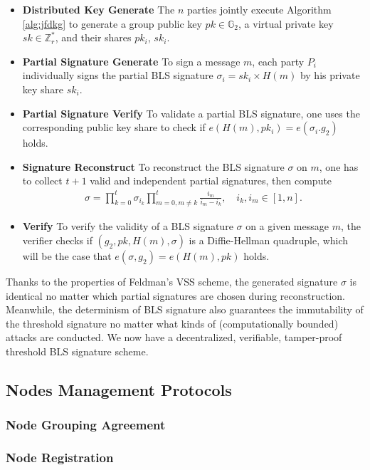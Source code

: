 \documentclass[11pt]{article}
\begin{document}
\begin{itemize}
    \item[] \textbf{Distributed Key Generate} The $n$ parties jointly execute Algorithm \ref{alg:jfdkg} to generate a group public key $pk \in \mathbb{G}_2$, a virtual private key $sk \in \mathbb{Z}_r^*$, and their shares $pk_i$, $sk_i$.
    \item[] \textbf{Partial Signature Generate} To sign a message $m$, each party $P_i$ individually signs the partial BLS signature $\sigma_i=sk_i \times H(m)$ by his private key share $sk_i$.
    \item[] \textbf{Partial Signature Verify} To validate a partial BLS signature, one uses the corresponding public key share to check if $e(H(m),pk_i)=e(\sigma_i.g_2)$ holds.
    \item[] \textbf{Signature Reconstruct} To reconstruct the BLS signature $\sigma$ on $m$, one has to collect $t+1$ valid and independent partial signatures, then compute
    \begin{align*}
        \sigma = \prod_{k=0}^t \sigma_{i_k} \prod_{m=0, m\neq k}^t \frac{i_m}{i_m-i_k},\quad i_k, i_m \in [1,n].
    \end{align*}
    \item[] \textbf{Verify} To verify the validity of a BLS signature $\sigma$ on a given message $m$, the verifier checks if $(g_2,pk,H(m),\sigma)$ is a Diffie-Hellman quadruple, which will be the case that $e(\sigma,g_2)=e(H(m),pk)$ holds.
\end{itemize}

Thanks to the properties of Feldman's VSS scheme, the generated signature $\sigma$ is identical no matter which partial signatures are chosen during reconstruction. Meanwhile, the determinism of BLS signature also guarantees the immutability of the threshold signature no matter what kinds of (computationally bounded) attacks are conducted. We now have a decentralized, verifiable, tamper-proof threshold BLS signature scheme.

\subsection{Nodes Management Protocols}

\subsubsection{Node Grouping Agreement}

\subsubsection{Node Registration}
\end{document}
